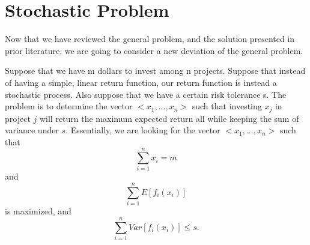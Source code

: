 \documentclass{article}
\begin{document}
\section{Stochastic Problem}
\par
Now that we have reviewed the general problem, and the solution presented in prior literature, we are going to consider a new deviation of the general problem.  
\par
Suppose that we have m dollars to invest among n projects. Suppose that instead of having a simple, linear return function, our return function is instead a stochastic process. Also suppose that we have a certain risk tolerance s. The problem is to determine the vector $<x_{1},...,x_{n}>$ such that investing $x_{j}$ in project $j$ will return the maximum expected return all while keeping the sum of variance under $s$. Essentially, we are looking for the vector $<x_{1},...,x_{n}>$ such that 
$$\sum_{i=1}^{n}x_{i} = m$$
and
$$\sum_{i=1}^{n} E[f_{i}(x_{i})]$$
is maximized, and
$$\sum_{i=1}^{n} Var[f_{i}(x_{i})] \leq s.$$
\end{document}
